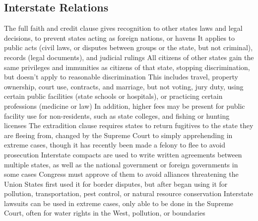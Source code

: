 \documentclass[11 pt, twoside]{article}
\newenvironment{outline*}
{
	\begin{outline}[enumerate]
	}
	{\end{outline}
}
\begin{document}
\subsection{Interstate Relations}
\begin{outline*}
\1 The full faith and credit clause gives recognition to other states laws and legal decisions, to prevent states acting as foreign nations, or havens
\2 It applies to public acts (civil laws, or disputes between groups or the state, but not criminal), records (legal documents), and judicial rulings
\1 All citizens of other states gain the same privileges and immunities as citizens of that state, stopping discrimination, but doesn’t apply to reasonable discrimination
\2 This includes travel, property ownership, court use, contracts, and marriage, but not voting, jury duty, using certain public facilities (state schools or hospitals), or practicing certain professions (medicine or law)
\2 In addition, higher fees may be present for public facility use for non-residents, such as state colleges, and fishing or hunting licenses
\1 The extradition clause requires states to return fugitives to the state they are fleeing from, changed by the Supreme Court to simply apprehending in extreme cases, though it has recently been made a felony to flee to avoid prosecution
\1 Interstate compacts are used to write written agreements between multiple states, as well as the national government or foreign governments in some cases
\2 Congress must approve of them to avoid alliances threatening the Union
\2 States first used it for border disputes, but after began using it for pollution, transportation, pest control, or natural resource conservation
\1 Interstate lawsuits can be used in extreme cases, only able to be done in the Supreme Court, often for water rights in the West, pollution, or boundaries
\end{outline*}
\end{document}
